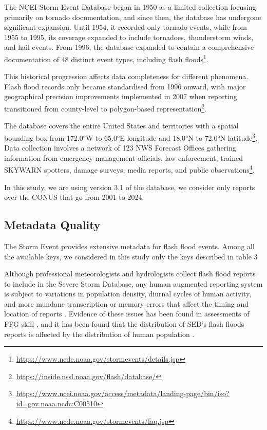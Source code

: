The NCEI Storm Event Database began in 1950 as a limited collection focusing primarily on tornado documentation, and since then, the database has undergone significant expansion. Until 1954, it recorded only tornado events, while from 1955 to 1995, its coverage expanded to include tornadoes, thunderstorm winds, and hail events. From 1996, the database expanded to contain a comprehensive documentation of 48 distinct event types, including flash floods\footnote{\url{https://www.ncdc.noaa.gov/stormevents/details.jsp}}. 

This historical progression affects data completeness for different phenomena. Flash flood records only became standardised from 1996 onward, with major geographical precision improvements implemented in 2007 when reporting transitioned from county-level to polygon-based representation\footnote{\url{https://inside.nssl.noaa.gov/flash/database/}}.

The database covers the entire United States and territories with a spatial bounding box from 172.0°W to 65.0°E longitude and 18.0°N to 72.0°N latitude\footnote{\url{https://www.ncei.noaa.gov/access/metadata/landing-page/bin/iso?id=gov.noaa.ncdc:C00510}}. Data collection involves a network of 123 NWS Forecast Offices gathering information from emergency management officials, law enforcement, trained SKYWARN spotters, damage surveys, media reports, and public observations\footnote{\url{https://www.ncdc.noaa.gov/stormevents/faq.jsp}}.

In this study, we are using version 3.1 of the database, we consider only reports over the CONUS that go from 2001 to 2024.


\subsection{Metadata Quality}

The Storm Event provides extensive metadata for flash flood events. Among all the available keys, we considered in this study only the keys described in table 3





Although professional meteorologists and hydrologists collect flash flood reports to include in the Severe Storm Database, any human augmented reporting system is subject to variations in population density, diurnal cycles of human activity, and more mundane transcription or memory errors that affect the timing and location of reports \citep{Barthold_2015}. Evidence of these issues has been found in assessments of FFG skill \citep{Clark_2014}, and it has been found that the distribution of SED's flash floods reports is affected by the distribution of human population \cite{Marjerison_2016}. 



